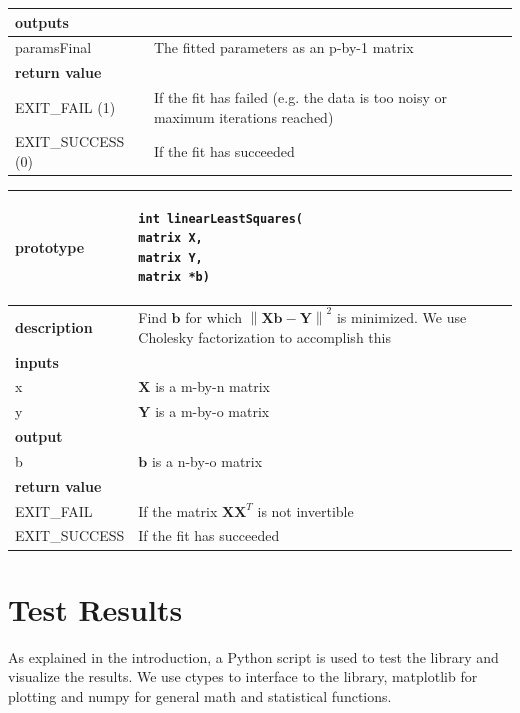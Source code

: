 \documentclass{article}
\newcommand\norm[1]{\left\lVert#1\right\rVert}
\begin{document}
\begin{center}
\begin{longtable}{|l|p{}|}
  \hline
  \multicolumn{2}{l}{\textbf{outputs}} \\
  \hline
  paramsFinal & The fitted parameters as an p-by-1 matrix \\
  \hline
  \multicolumn{2}{l}{\textbf{return value}} \\
  \hline
  EXIT\_FAIL (1) & If the fit has failed (e.g. the data is too noisy or maximum iterations reached) \\
  \hline
  EXIT\_SUCCESS (0) & If the fit has succeeded \\
  \hline
\end{longtable}
\end{center}

\begin{center}
\begin{longtable}{|l|p{}|}
  \hline
  \textbf{prototype} & \begin{lstlisting} 
int linearLeastSquares(
matrix X, 
matrix Y, 
matrix *b)
\end{lstlisting} \\
\hline
\textbf{description} & Find $\mathbf{b}$ for which $\norm{\mathbf{Xb}-\mathbf{Y}}^2$ is minimized. We use Cholesky factorization to accomplish this\\
\hline
\multicolumn{2}{l}{\textbf{inputs}} \\
 \hline
x & $\mathbf{X}$ is a m-by-n matrix \\
\hline
y & $\mathbf{Y}$ is a m-by-o matrix \\
\hline
\multicolumn{2}{l}{\textbf{output}} \\
\hline
b & $\mathbf{b}$ is a n-by-o matrix \\
\hline
\multicolumn{2}{l}{\textbf{return value}} \\
\hline
EXIT\_FAIL & If the matrix $\mathbf{X}\mathbf{X}^T$ is not invertible \\
\hline
EXIT\_SUCCESS & If the fit has succeeded \\
\hline
\end{longtable} 
\end{center}

\section{Test Results}

As explained in the introduction, a Python script is used to test the library and visualize the results. We use ctypes to interface to the library, matplotlib for plotting and numpy for general math and statistical functions. 
\end{document}
